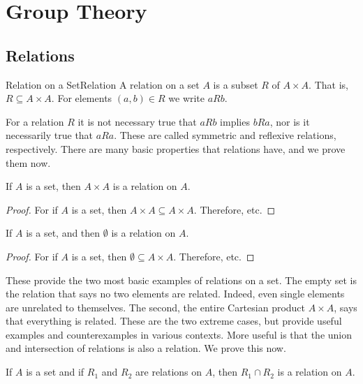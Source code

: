 \chapter{Group Theory}
    \section{Relations}
        \begin{ldefinition}{Relation on a Set}{Relation}
            A relation on a set $A$ is a subset $R$ of $A\times{A}$.
            That is, $R\subseteq{A}\times{A}$. For elements
            $(a,b)\in{R}$ we write $aRb$.
        \end{ldefinition}
        For a relation $R$ it is not necessary true that $aRb$
        implies $bRa$, nor is it necessarily true that $aRa$. These
        are called symmetric and reflexive relations, respectively.
        There are many basic properties that relations have, and we
        prove them now.
        \begin{theorem}
            \label{thm:Cartesian_Product_Is_Relation}%
            If $A$ is a set, then $A\times{A}$ is a relation on $A$.
        \end{theorem}
        \begin{proof}
            For if $A$ is a set, then
            $A\times{A}\subseteq{A}\times{A}$. Therefore, etc.
        \end{proof}
        \begin{theorem}
            \label{thm:Empty_Set_Is_Relation}%
            If $A$ is a set, and then $\emptyset$ is a relation
            on $A$.
        \end{theorem}
        \begin{proof}
            For if $A$ is a set, then
            $\emptyset\subseteq{A}\times{A}$. Therefore, etc.
        \end{proof}
        These provide the two most basic examples of relations on a
        set. The empty set is the relation that says no two elements
        are related. Indeed, even single elements are unrelated to
        themselves. The second, the entire Cartesian product
        $A\times{A}$, says that everything is related. These are the
        two extreme cases, but provide useful examples and
        counterexamples in various contexts. More useful is that the
        union and intersection of relations is also a relation. We
        prove this now.
        \begin{theorem}
            \label{thm:Intersection_of_Relations_Is_Relation}%
            If $A$ is a set and if $R_{1}$ and $R_{2}$ are relations
            on $A$, then $R_{1}\cap{R}_{2}$ is a relation on $A$.
        \end{theorem}
